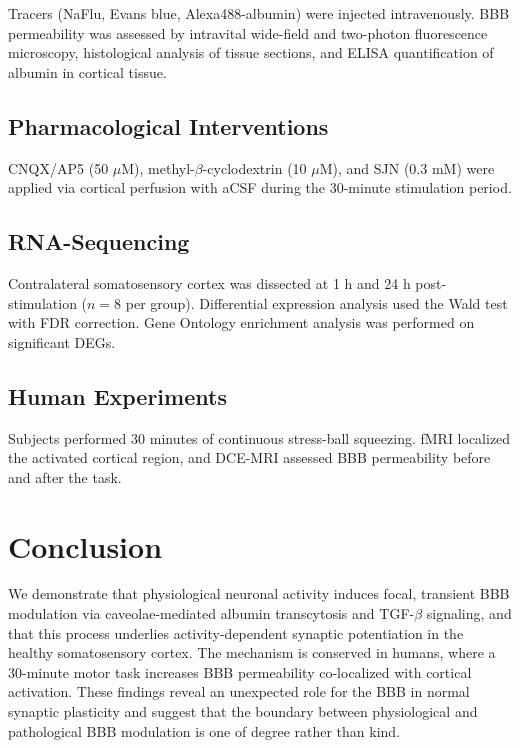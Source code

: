 \documentclass[11pt]{article}
\begin{document}
Tracers (NaFlu, Evans blue, Alexa488-albumin) were injected intravenously. BBB permeability was assessed by intravital wide-field and two-photon fluorescence microscopy, histological analysis of tissue sections, and ELISA quantification of albumin in cortical tissue.

\subsection{Pharmacological Interventions}

CNQX/AP5 (50 $\mu$M), methyl-$\beta$-cyclodextrin (10 $\mu$M), and SJN (0.3 mM) were applied via cortical perfusion with aCSF during the 30-minute stimulation period.

\subsection{RNA-Sequencing}

Contralateral somatosensory cortex was dissected at 1 h and 24 h post-stimulation ($n = 8$ per group). Differential expression analysis used the Wald test \citep{love2009moderated} with FDR correction. Gene Ontology enrichment analysis was performed on significant DEGs.

\subsection{Human Experiments}

Subjects performed 30 minutes of continuous stress-ball squeezing. fMRI localized the activated cortical region, and DCE-MRI \citep{tofts1999estimating} assessed BBB permeability before and after the task.

\section{Conclusion}

We demonstrate that physiological neuronal activity induces focal, transient BBB modulation via caveolae-mediated albumin transcytosis and TGF-$\beta$ signaling, and that this process underlies activity-dependent synaptic potentiation in the healthy somatosensory cortex. The mechanism is conserved in humans, where a 30-minute motor task increases BBB permeability co-localized with cortical activation. These findings reveal an unexpected role for the BBB in normal synaptic plasticity and suggest that the boundary between physiological and pathological BBB modulation is one of degree rather than kind.



\end{document}
